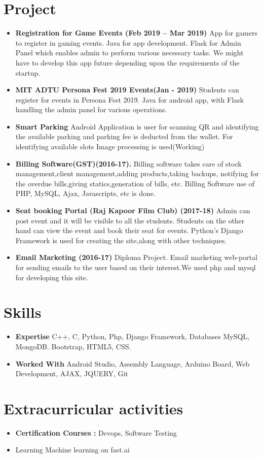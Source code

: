 \documentclass[letterpaper,11pt]{article}
\newcommand{\resumeItem}[2]{
  \item\small{
    \textbf{#1}{ #2 \vspace{-2pt}}
  }
}
\newcommand{\resumeSubItem}[2]{\resumeItem{#1}{#2}\vspace{-4pt}}
\newcommand{\resumeSubHeadingListStart}{\begin{itemize}[leftmargin=*]}
\newcommand{\resumeSubHeadingListEnd}{\end{itemize}}
\newcommand{\resumeItemListEnd}{\end{itemize}\vspace{-5pt}}
\begin{document}
\section{Project}
  \resumeSubHeadingListStart
        \resumeItem{Registration for Game Events (Feb 2019 – Mar 2019)}
          {App for gamers to register in gaming events. Java for app development. Flask for Admin Panel which enables admin to perform various necessary tasks. We might have to develop this app future depending upon the requirements of the startup.}
        \resumeItem{MIT ADTU Persona Fest 2019 Events(Jan - 2019)}
          {Students can register for events in Persona Fest 2019. Java for android app, with Flask handling the admin panel for various operations.}
          \resumeItem{Smart Parking}
          {Android Application is user for scanning QR and identifying the available parking and parking fee is deducted from the wallet. For identifying available slots Image processing is used(Working)}
          \resumeItem{Billing Software(GST)(2016-17).}
          {Billing software takes care of stock management,client management,adding products,taking backups, notifying for the overdue bills,giving statics,generation of bills, etc. Billing Software use of PHP, MySQL, Ajax, Javascripts, etc is done.}
        \resumeItem{Seat booking Portal (Raj Kapoor Film Club) (2017-18)}
          {Admin can post event and it will be visible to all the students. Students on the other hand can view the event and book their seat for events. Python's Django Framework is used for creating the site,along with other techniques.}
         \resumeItem{Email Marketing (2016-17)}
          {Diploma Project. Email marketing web-portal for sending emails to the user based on their interest.We used php and mysql for developing this site.}
          
      \resumeItemListEnd



\section{Skills}
  \resumeSubHeadingListStart
    \resumeSubItem{Expertise}
      {C++, C, Python, Php, Django Framework, Databases MySQL, MongoDB. Bootstrap, HTML5, CSS.}
    \resumeSubItem{Worked With}
      {Android Studio, Assembly Language, Arduino Board, Web Development, AJAX, JQUERY, Git}
  \resumeSubHeadingListEnd
  
\section{Extracurricular activities}
  \resumeSubHeadingListStart
    \resumeSubItem{Certification Courses :}{Devops, Software Testing}
    \resumeSubItem{}{Learning Machine learning on fast.ai}
  \resumeSubHeadingListEnd
  
\end{document}
